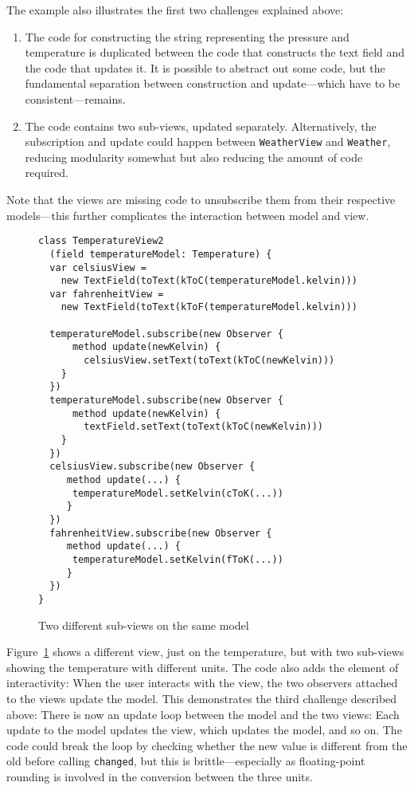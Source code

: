\documentclass[sigplan,screen]{acmart}
\begin{document}
\label{sec:challenges}
The example also illustrates the first two challenges explained above:
%
\begin{enumerate}
\item The code for constructing the string representing the pressure
  and temperature is duplicated between the code that constructs the
  text field and the code that updates it.  It is possible to abstract
  out some code, but the fundamental separation between construction
  and update---which have to be consistent---remains.
\item The code contains two sub-views, updated separately.
  Alternatively, the subscription and update could happen between
  \texttt{WeatherView} and \texttt{Weather}, reducing modularity
  somewhat but also reducing the amount of code required.
\end{enumerate}
%
Note that the views are missing code to unsubscribe them from their
respective models---this further complicates the interaction between
model and view.

\begin{figure}[tb]
\begin{verbatim}
class TemperatureView2
  (field temperatureModel: Temperature) {
  var celsiusView =
    new TextField(toText(kToC(temperatureModel.kelvin)))
  var fahrenheitView =
    new TextField(toText(kToF(temperatureModel.kelvin)))

  temperatureModel.subscribe(new Observer {
      method update(newKelvin) {
        celsiusView.setText(toText(kToC(newKelvin)))
    }
  })
  temperatureModel.subscribe(new Observer {
      method update(newKelvin) {
        textField.setText(toText(kToC(newKelvin)))
    }
  })
  celsiusView.subscribe(new Observer {
     method update(...) {
      temperatureModel.setKelvin(cToK(...))
     }
  })
  fahrenheitView.subscribe(new Observer {
     method update(...) {
      temperatureModel.setKelvin(fToK(...))
     }
  })
}
\end{verbatim}
  \caption{Two different sub-views on the same model}
  \label{fig:temperature-view2}
\end{figure}
%
Figure~\ref{fig:temperature-view2} shows a different view, just on the
temperature, but with two sub-views showing the temperature with
different units.  The code also adds the element of interactivity:
When the user interacts with the view, the two observers attached to
the views update the model.  This demonstrates the third challenge
described above: There is now an update loop between the model and
the two views: Each update to the model updates the view, which
updates the model, and so on.  The code could break the loop by
checking whether the new value is different from the old before
calling \texttt{changed}, but this is brittle---especially as
floating-point rounding is involved in the conversion between the
three units.
\end{document}

